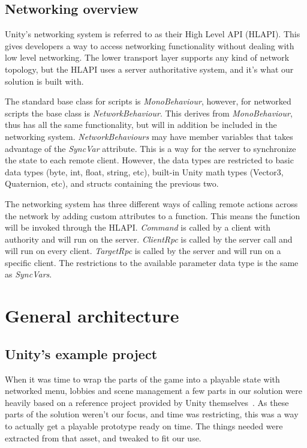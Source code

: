 \subsection{Networking overview}
Unity's networking system is referred to as their High Level API (HLAPI). This gives developers a way to access networking functionality without dealing with low level networking. The lower transport layer supports any kind of network topology, but the HLAPI uses a server authoritative system, and it's what our solution is built with.

The standard base class for scripts is \emph{MonoBehaviour}, however, for networked scripts the base class is \emph{NetworkBehaviour}. This derives from \emph{MonoBehaviour}, thus has all the same functionality, but will in addition be included in the networking system. \emph{NetworkBehaviours} may have member variables that takes advantage of the \emph{SyncVar} attribute. This is a way for the server to synchronize the state to each remote client. However, the data types are restricted to basic data types (byte, int, float, string, etc), built-in Unity math types (Vector3, Quaternion, etc), and structs containing the previous two.

The networking system has three different ways of calling remote actions across the network by adding custom attributes to a function. This means the function will be invoked through the HLAPI. \emph{Command} is called by a client with authority and will run on the server. \emph{ClientRpc} is called by the server call and will run on every client. \emph{TargetRpc} is called by the server and will run on a specific client. The restrictions to the available parameter data type is the same as \emph{SyncVars}.~\cite{unityUNETManual}

\section{General architecture}

\subsection{Unity's example project}
When it was time to wrap the parts of the game into a playable state with networked menu, lobbies and scene management a few parts in our solution were heavily based on a reference project provided by Unity themselves~\cite{unityTanksProject}. As these parts of the solution weren't our focus, and time was restricting, this was a way to actually get a playable prototype ready on time. The things needed were extracted from that asset, and tweaked to fit our use.

